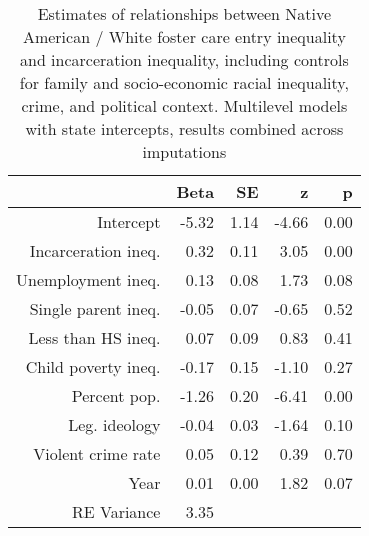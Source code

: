 \begin{table}[ht]
\centering
\caption{Estimates of relationships between Native American / White foster care entry inequality and incarceration inequality, including controls for family and socio-economic racial inequality, crime, and political context. Multilevel models with state intercepts, results combined across imputations} 
\begin{tabular}{rrrrr}
  \hline
 & Beta & SE & z & p \\ 
  \hline
Intercept & -5.32 & 1.14 & -4.66 & 0.00 \\ 
  Incarceration ineq. & 0.32 & 0.11 & 3.05 & 0.00 \\ 
  Unemployment ineq. & 0.13 & 0.08 & 1.73 & 0.08 \\ 
  Single parent ineq. & -0.05 & 0.07 & -0.65 & 0.52 \\ 
  Less than HS ineq. & 0.07 & 0.09 & 0.83 & 0.41 \\ 
  Child poverty ineq. & -0.17 & 0.15 & -1.10 & 0.27 \\ 
  Percent pop. & -1.26 & 0.20 & -6.41 & 0.00 \\ 
  Leg. ideology & -0.04 & 0.03 & -1.64 & 0.10 \\ 
  Violent crime rate & 0.05 & 0.12 & 0.39 & 0.70 \\ 
  Year & 0.01 & 0.00 & 1.82 & 0.07 \\ 
  RE Variance & 3.35 &  &  &  \\ 
   \hline
\end{tabular}
\end{table}
